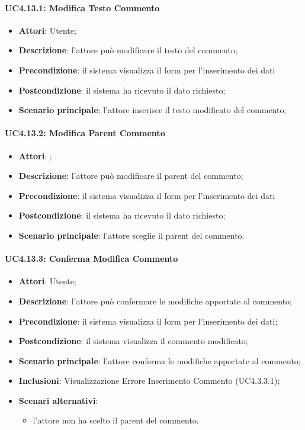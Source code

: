 \paragraph{UC4.13.1: Modifica Testo Commento}
\label{UC4.13.1}
\begin{itemize}
\item \textbf{Attori}: Utente;
\item \textbf{Descrizione}: l'attore può modificare il testo del commento;	
\item \textbf{Precondizione}: il sistema visualizza il form per l'inserimento dei dati	
\item \textbf{Postcondizione}: il sistema ha ricevuto il dato richiesto;	
\item \textbf{Scenario principale}:
l'attore inserisce il testo modificato del commento;	
\end{itemize}

\paragraph{UC4.13.2: Modifica Parent Commento}
\label{UC4.13.2}
\begin{itemize}
\item \textbf{Attori}: ;
\item \textbf{Descrizione}: l'attore può modificare il parent del commento;	
\item \textbf{Precondizione}: il sistema visualizza il form per l'inserimento dei dati	
\item \textbf{Postcondizione}: il sistema ha ricevuto il dato richiesto;	
\item \textbf{Scenario principale}:
l'attore sceglie il parent del commento.
\end{itemize}

\paragraph{UC4.13.3: Conferma Modifica Commento}
\label{UC4.13.3}
\begin{itemize}
\item \textbf{Attori}: Utente;
\item \textbf{Descrizione}: l'attore può confermare le modifiche apportate al commento;	
\item \textbf{Precondizione}: il sistema visualizza il form per l'inserimento dei dati;	
\item \textbf{Postcondizione}: il sistema visualizza il commento modificato;	
\item \textbf{Scenario principale}:
l'attore conferma le modifiche apportate al commento;	
\item \textbf{Inclusioni}:
Visualizzazione Errore Inserimento Commento (UC4.3.3.1);
\item \textbf{Scenari alternativi}:
\begin{itemize}
\item l'attore non ha scelto il parent del commento. 
\end{itemize}
\end{itemize}

